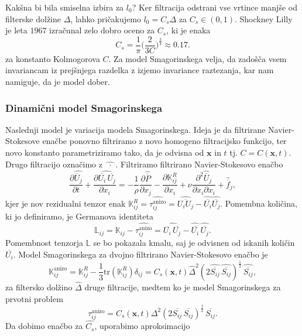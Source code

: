 \documentclass[mat2, tisk]{fmfdelo}
\newcommand{\bd}{\textbf}
\begin{document}
Kakšna bi bila smiselna izbira za $l_0$? Ker filtracija 
odstrani vse vrtince manjše od filterske dolžine $\Delta$, lahko 
pričakujemo $l_0 = C_s \Delta$ za $C_s\in (0, 1)$. Shockney Lilly je leta $1967$
izračunal zelo dobro oceno za $C_s$, ki je enaka 
$$
C_s = \frac{1}{\pi} \Big(\frac{2}{3C}\Big)^\frac{3}{4} \approx 0.17.
$$
za konstanto Kolmogorova $C$.
Za model Smagorinskega velja, da zadošča vsem invariancam iz prejšnjega razdelka
z izjemo invariance raztezanja, kar nam namiguje, da je model dober. 

\subsubsection{Dinamični model Smagorinskega}

Naslednji model je variacija modela Smagorinskega. Ideja je da 
filtrirane Navier-Stokesove enačbe ponovno filtriramo z novo homogeno
filtracijsko funkcijo, ter novo konstanto parametriziramo tako, da je odvisna od $\bd{x}$ in $t$
tj. $C = C(\bd{x}, t)$. Drugo filtracijo označimo z $\widehat{\,\,\cdot\,\,}$.
Filtriramo filtrirano Navier-Stokesovo enačbo 
$$
\frac{\partial \widehat{\overline{U}_j}}{\partial t} + \frac{\partial \widehat{\overline{U_i}\, \overline{U_j}}}{\partial x_i} = -\frac{1}{\rho} \frac{\partial \widehat{\overline{P}}}{\partial x_j} 
- \frac{\partial \mathbb{K}_{ij}^R}{\partial x_i}+ \nu \frac{\partial^2 \widehat{\overline{U}}_j}{\partial x_i \partial x_i} + \widehat{\overline{f}}_j,
$$
kjer je nov rezidualni tenzor enak $\mathbb{K}_{ij}^R = \widehat{\tau_{ij}^\text{anizo}} = \widehat{\overline{U_i U_j}} - \widehat{\overline{U_i}} \widehat{\overline{U_j}}$.
Pomembna količina, ki jo definiramo, je Germanova identiteta
$$
\mathbb{L}_{ij} = \mathbb{K}_{ij} - \widehat{\tau_{ij}^\text{anizo}} = \widehat{\overline{U_i} \,\overline{U_j}} - \widehat{\overline{U_i}}\, \widehat{\overline{U_j}}.
$$
Pomembnost tenzorja $\mathbb{L}$ se bo pokazala kmalu, saj je 
odvisnen od iskanih količin $\overline{U_i}$. 
Model Smagorinskega za dvojno filtrirano Navier-Stokesovo enačbo je
$$
\mathbb{K}_{ij}^\text{anizo} = \mathbb{K}_{ij}^R - \frac{1}{3} \text{tr}(\mathbb{K}_{ij}^R) \delta_{ij} = C_s(\bd{x}, t) \widehat{\Delta}^2 (2 \widehat{\overline{S_{ij}}} \,\widehat{\overline{S_{ij}}})^\frac{1}{2} \,\widehat{\overline{S_{ij}}},
$$
za filtersko dolžino $\widehat{\Delta}$ druge filtracije, 
medtem ko je model Smagorinskega za prvotni problem
$$
\tau_{ij}^\text{anizo} = C_s(\bd{x}, t) \Delta^2 (2 \overline{S_{ij}} \,\overline{S_{ij}})^\frac{1}{2} \,\overline{S_{ij}}.
$$
Da dobimo enačbo za $\widehat{C_s}$, uporabimo aproksimacijo 
\end{document}
